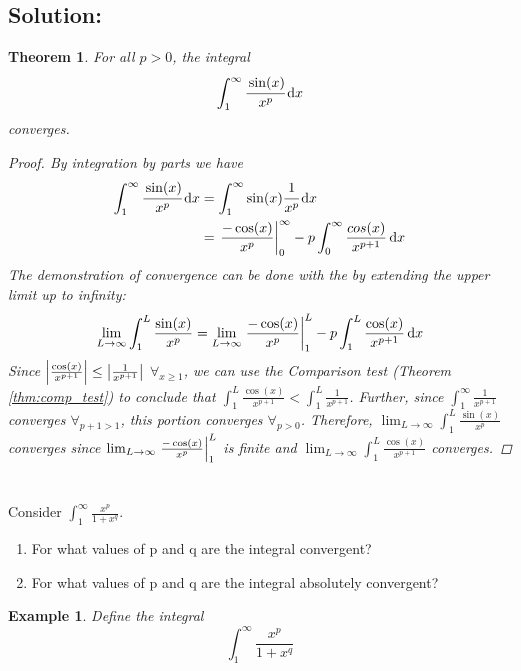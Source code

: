 \documentclass[]{article}
\newtheorem{theorem}{Theorem}
\newtheorem{example}{Example}
\begin{document}
\subsection{Solution:}
\begin{theorem}
    For all $p>0$, the integral \[
        \int_{1}^{\infty} \cfrac{\sin(x)}{x^p} \dd{x}
    \] converges.
    \begin{proof}
        By integration by parts we have\begin{align*}
            \int_{1}^{\infty} \cfrac{\sin(x)}{x^p} \dd{x}
                &= \int_{1}^{\infty} \sin(x) \cfrac{1}{x^p} \dd{x}\\
                &= \eval{\frac{-\cos(x)}{x^p}}_{0}^{\infty} - p \int_{0}^{\infty} \frac{cos(x)}{x^{p+1}} \dd{x}
        \end{align*}
        The demonstration of convergence can be done with the by extending the upper limit up to infinity:\[
            \lim_{L\to \infty} \int_{1}^{L} \frac{\sin(x)}{x^p}
            = \lim_{L\to \infty} \eval{\frac{-\cos(x)}{x^p}}_{1}^{L} - p \int_{1}^{L} \frac{\cos(x)}{x^{p+1}} \dd{x}
        \]
        Since $\abs{\frac{\cos(x)}{x^{p+1}}} \leq \abs{\frac{1}{x^{p+1}}}$ $\forall_{x \geq 1}$, we can use the Comparison test (Theorem \ref{thm:comp_test}) to conclude that $\int_1^{L}\frac{\cos(x)}{x^{p+1}} < \int_1^{L} \frac{1}{x^{p+1}}$.
        Further, since $\int_1^{\infty} \frac{1}{x^{p+1}}$ converges $\forall_{p+1 > 1}$, this portion converges $\forall_{p > 0}$.
        Therefore, $\lim_{L\to \infty} \int_{1}^{L} \frac{\sin(x)}{x^p}$ converges since $\lim_{L\to \infty} \eval{\frac{-\cos(x)}{x^p}}_{1}^{L}$ is finite and $\lim_{L\to\infty} \int_1^{L}\frac{\cos(x)}{x^{p+1}}$ converges.
    \end{proof}
\end{theorem}










\newpage
\section{}
Consider $\int_{1}^{\infty} \frac{x^p}{1 + x^q}$.
\begin{enumerate}
    \item For what values of p and q are the integral convergent?
    \item For what values of p and q are the integral absolutely convergent?
\end{enumerate}

\begin{example}
    Define the integral\[
        \int_{1}^{\infty} \frac{x^p}{1 + x^q}
    \]
    
\end{example}
\end{document}
